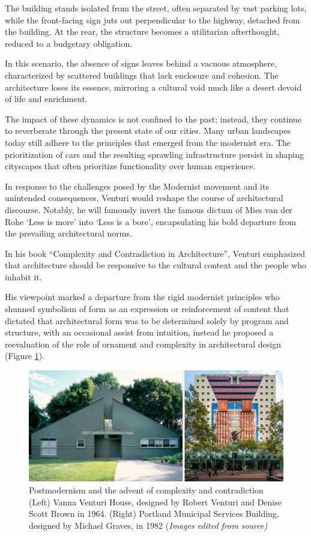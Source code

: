 The building stands isolated from the street, often separated by vast parking lots, while the front-facing sign juts out perpendicular to the highway, detached from the building.
At the rear, the structure becomes a utilitarian afterthought, reduced to a budgetary obligation\cite{Venturi1972}.

In this scenario, the absence of signs leaves behind a vacuous atmosphere, characterized by scattered buildings that lack enclosure and cohesion.
The architecture loses its essence, mirroring a cultural void much like a desert devoid of life and enrichment.

The impact of these dynamics is not confined to the past;
instead, they continue to reverberate through the present state of our cities.
Many urban landscapes today still adhere to the principles that emerged from the modernist era.
The prioritization of cars and the resulting sprawling infrastructure persist in shaping cityscapes that often prioritize functionality over human experience.

In response to the challenges posed by the Modernist movement and its unintended consequences, Venturi would reshape the course of architectural discourse.
Notably, he will famously invert the famous dictum of Mies van der Rohe ‘Less is more’ into ‘Less is a bore'\cite{Lutolli2020}, encapsulating his bold departure from the prevailing architectural norms.

In his book ``Complexity and Contradiction in Architecture''\cite{Venturi1977}, Venturi emphasized that architecture should be responsive to the cultural context and the people who inhabit it.

His viewpoint marked a departure from the rigid modernist principles who shunned symbolism of form as an expression or reinforcement of content that dictated that architectural form was to be determined solely by program and structure, with an  occasional  assist from  intuition\cite{Venturi1972}, instead he proposed a reevaluation of the role of ornament and complexity in architectural design (Figure \ref{fig:postmodernfacade}).

     \begin{figure}[htb]
          \centering
          \includegraphics[width= \linewidth]{Images/PostmodernismVenturi}
          \caption{Postmodernism and the advent of complexity and contradiction (Left) Vanna Venturi House, designed by Robert Venturi and Denise Scott Brown in 1964. (Right) Portland Municipal Services Building, designed by Michael Graves, in 1982 (\textit{Images edited from source)}}
          \label{fig:postmodernfacade}
        \end{figure}

